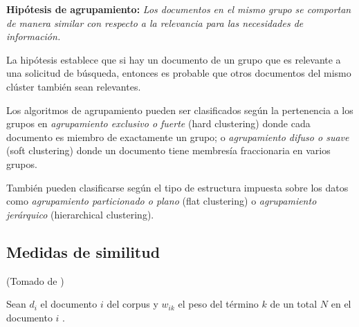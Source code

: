 \documentclass{llncs}
\begin{document}
\vspace{1em}
\textbf{Hip\'otesis de agrupamiento:} \textit{Los documentos en el mismo grupo se comportan de manera similar con respecto a la relevancia para las necesidades de información.}
	
\vspace{0.3em}
La hipótesis establece que si hay un documento de un grupo que es relevante a una solicitud de búsqueda, entonces es probable que otros documentos del mismo clúster también sean relevantes. 
\vspace{1em}

Los algoritmos de agrupamiento pueden ser clasificados seg\'un la pertenencia a los grupos en \textit{agrupamiento exclusivo o fuerte} (hard clustering) donde cada documento es miembro de exactamente un grupo; o \textit{agrupamiento difuso o suave} (soft clustering) donde un documento tiene membresía fraccionaria en varios grupos.

Tambi\'en pueden clasificarse seg\'un el tipo de estructura impuesta sobre los datos como \textit{agrupamiento particionado o plano} (flat clustering) o \textit{agrupamiento jer\'arquico} (hierarchical clustering).

\subsection{Medidas de similitud}

\begin{flushright}
	\scriptsize*(Tomado de \cite{B3})
	\normalsize
\end{flushright}

Sean $ d_{i} $ el documento $ i $ del corpus y $ w_{ik} $ el peso del t\'ermino $ k $ de un total $ N $ en el documento $ i $ .
\end{document}
